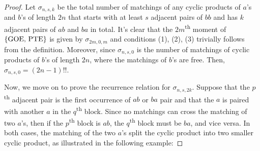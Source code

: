 \documentclass[11pt,reqno]{amsart}
\numberwithin{equation}{section}
\theoremstyle{plain}
\begin{document}
\begin{proof}
Let $\sigma_{n, s, k}$ be the total number of matchings of any cyclic products of $a$'s and $b$'s of length $2n$ that starts with at least $s$ adjacent pairs of $bb$ and has $k$ adjacent pairs of $ab$ and $ba$ in total. It's clear that the $2m$\textsuperscript{th} moment of $\{\textup{GOE, PTE}\}$ is given by $\sigma_{2m, 0, m}$ and conditions (1), (2), (3) trivially follows from the definition. Moreover, since $\sigma_{n, s, 0}$ is the number of matchings of cyclic products of $b$'s of length $2n$, where the matchings of $b$'s are free. Then, $\sigma_{n,s,0}=(2n-1)!!$. 

Now, we move on to prove the recurrence relation for $\sigma_{n, s, 2k}$. Suppose that the $p$\textsuperscript{th} adjacent pair is the first occurrence of $ab$ or $ba$ pair and that the $a$ is paired with another $a$ in the $q$\textsuperscript{th} block. Since no matchings can cross the matching of two $a$'s, then if the $p$\textsuperscript{th} block is $ab$, the $q$\textsuperscript{th} block must be $ba$, and vice versa. In both cases, the matching of the two $a$'s split the cyclic product into two smaller cyclic product, as illustrated in the following example:


\end{proof}
\end{document}
